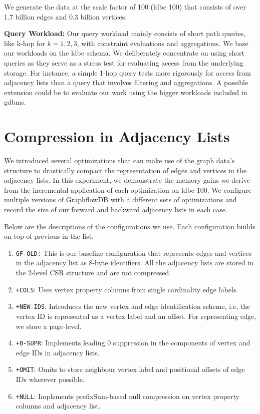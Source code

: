 We generate the data at the scale factor of 100 (\gls{ldbc} 100) that consists of over 1.7 billion edges and 0.3 billion vertices.

\noindent \textbf{Query Workload:} Our query workload mainly consists of short path queries, like k-hop for $k=1,2,3$, with constraint evaluations and aggregations. We base our workloads on the \gls{ldbc} schema. We deliberately concentrate on using short queries as they serve as a stress test for evaluating access from the underlying storage. For instance, a simple 1-hop query tests more rigorously for access from adjacency lists than a query that involves filtering and aggregations. A possible extension could be to evaluate our work using the bigger workloads included in \gls{gdbms}.

\section{Compression in Adjacency Lists}
\label{exp:adjacency-list-exp}

We introduced several optimizations that can make use of the graph data's structure to drastically compact the representation of edges and vertices in the adjacency lists. In this experiment, we demonstrate the memory gains we derive from the incremental application of each optimization on \gls{ldbc} 100. We configure multiple versions of GraphflowDB with a different sets of optimizations and record the size of our forward and backward adjacency lists in each case.

Below are the descriptions of the configurations we use. Each configuration builds on top of previous in the list. 

\begin{enumerate}
	\item \texttt{GF-OLD:} This is our baseline configuration that represents edges and vertices in the adjacency list as 8-byte identifiers. All the adjacency lists are stored in the 2-level CSR structure and are not compressed.
	\item \texttt{+COLS}: Uses vertex property columns from single cardinality edge labels. 
	\item \texttt{+NEW-IDS}: Introduces the new vertex and edge identification scheme, i.e, the vertex ID is represented as a vertex label and an offset. For representing edge, we store a page-level.
	\item \texttt{+0-SUPR}: Implements leading 0 suppression in the components of vertex and edge IDs in adjacency lists.
	\item \texttt{+OMIT}: Omits to store neighbour vertex label and positional offsets of edge IDs wherever possible.
	\item \texttt{+NULL}: Implements prefixSum-based null compression on vertex property columns and adjacency list.
\end{enumerate}

